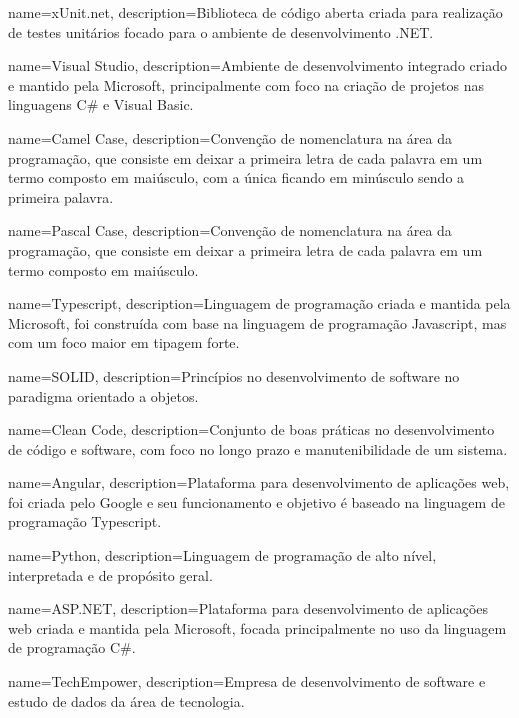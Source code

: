  {
    name=xUnit.net,
    description={Biblioteca de código aberta criada para realização de testes unitários focado para o ambiente de desenvolvimento .NET.}
}

 {
    name=Visual Studio,
    description={Ambiente de desenvolvimento integrado criado e mantido pela Microsoft, principalmente com foco na criação de projetos nas linguagens C\# e Visual Basic.}
}

 {
    name=Camel Case,
    description={Convenção de nomenclatura na área da programação, que consiste em deixar a primeira letra de cada palavra em um termo composto em maiúsculo, com a única ficando em minúsculo sendo a primeira palavra.}
}

 {
    name=Pascal Case,
    description={Convenção de nomenclatura na área da programação, que consiste em deixar a primeira letra de cada palavra em um termo composto em maiúsculo.}
}

 {
    name=Typescript,
    description={Linguagem de programação criada e mantida pela Microsoft, foi construída com base na linguagem de programação Javascript, mas com um foco maior em tipagem forte.}
}

 {
    name=SOLID,
    description={Princípios no desenvolvimento de software no paradigma orientado a objetos.}
}

 {
    name=Clean Code,
    description={Conjunto de boas práticas no desenvolvimento de código e software, com foco no longo prazo e manutenibilidade de um sistema.}
}

 {
    name=Angular,
    description={Plataforma para desenvolvimento de aplicações web, foi criada pelo Google e seu funcionamento e objetivo é baseado na linguagem de programação Typescript.}
}

 {
    name=Python,
    description={Linguagem de programação de alto nível, interpretada e de propósito geral. }
}

 {
    name=ASP.NET,
    description={Plataforma para desenvolvimento de aplicações web criada e mantida pela Microsoft, focada principalmente no uso da linguagem de programação C\#.}
}

 {
    name=TechEmpower,
    description={Empresa de desenvolvimento de software e estudo de dados da área de tecnologia.}
}

